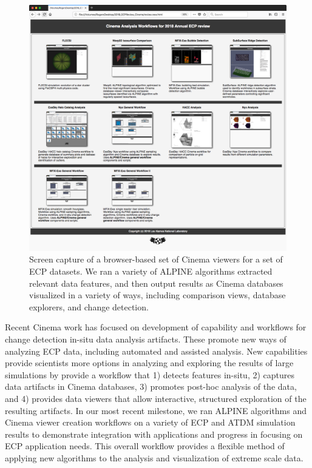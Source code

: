 \begin{figure}[htb]
	\centering
	\includegraphics[width=5in]{projects/2.3.6-NNSA/2.3.6.01-LANL-ATDM/ECPReviewScreenshot.png}
	\caption{
        Screen capture of a browser-based set of Cinema viewers 
        for a set of ECP datasets. We ran a variety of ALPINE algorithms
        extracted relevant data features, and then output 
        results as Cinema databases visualized in
        a variety of ways, including comparison views, database
        explorers, and change detection.
    }
\end{figure}

Recent Cinema work has focused on development of capability
and workflows for change detection in-situ data analysis artifacts. These
promote new ways of analyzing ECP data, including
automated and assisted analysis. New capabilities provide 
scientists more options in analyzing and exploring the results of large
simulations by provide a workflow that 1) detects features in-situ, 2)
captures data artifacts in Cinema databases, 3) promotes
post-hoc analysis of the data, and 4)
provides data viewers that allow interactive, structured exploration of the
resulting artifacts. In our most recent milestone, we ran
ALPINE algorithms and Cinema viewer creation workflows on a variety of
ECP and ATDM simulation results to demonstrate integration with applications
and progress in focusing on ECP application needs.
This overall workflow provides a
flexible method of applying new algorithms to the analysis and visualization
of extreme scale data.

